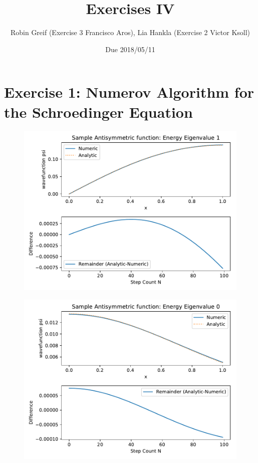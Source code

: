 \documentclass[12pt,a4paper,twoside]{article}
\title{Exercises IV}
\author{Robin Greif (Exercise 3 Francisco Aros), Lia Hankla (Exercise 2 Victor Ksoll)}
\date{Due 2018/05/11}
\begin{document}
\maketitle

\section{Exercise 1: Numerov Algorithm for the Schroedinger Equation}

\begin{figure}[h!]
  \centering
  \includegraphics[width=.9\textwidth]{../exercise4_problem1_antisymEx.pdf}
  \caption{} \label{fig:1a}
\end{figure}

\begin{figure}[h!]
  \centering
  \includegraphics[width=.9\textwidth]{../exercise4_problem1_symEx.pdf}
  \caption{} \label{fig:1b}
\end{figure}
\end{document}
